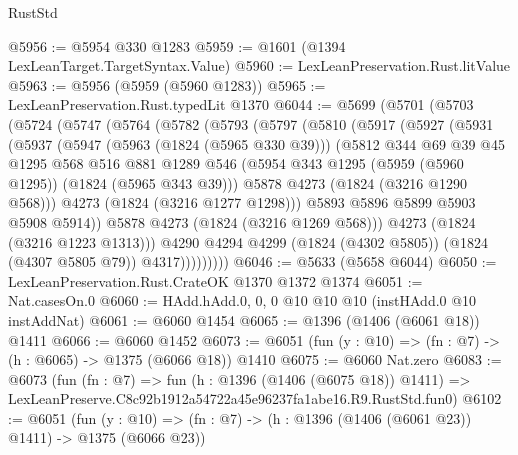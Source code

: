 \begin{lexlean}{RustStd}
\begin{coremodule}
@5956 := @5954 @330 @1283
@5959 := @1601 (@1394 LexLeanTarget.TargetSyntax.Value)
@5960 := LexLeanPreservation.Rust.litValue
@5963 := @5956 (@5959 (@5960 @1283))
@5965 := LexLeanPreservation.Rust.typedLit @1370
@6044 := @5699
    (@5701
      (@5703
        (@5724
          (@5747
            (@5764
              (@5782
                (@5793
                  (@5797
                    (@5810
                      (@5917
                        (@5927
                          (@5931
                            (@5937
                              (@5947
                                (@5963 (@1824 (@5965 @330 @39)))
                                (@5812
                                  @344
                                  @69
                                  @39
                                  @45
                                  @1295
                                  @568
                                  @516
                                  @881
                                  @1289
                                  @546
                                  (@5954 @343 @1295 (@5959 (@5960 @1295)) (@1824 (@5965 @343 @39)))
                                  @5878
                                  @4273
                                  (@1824 (@3216 @1290 @568)))
                                @4273
                                (@1824 (@3216 @1277 @1298)))
                              @5893
                              @5896
                              @5899
                              @5903
                              @5908
                              @5914))
                          @5878
                          @4273
                          (@1824 (@3216 @1269 @568)))
                        @4273
                        (@1824 (@3216 @1223 @1313)))
                      @4290
                      @4294
                      @4299
                      (@1824 (@4302 @5805))
                      (@1824 (@4307 @5805 @79))
                      @4317)))))))))
@6046 := @5633 (@5658 @6044)
@6050 := LexLeanPreservation.Rust.CrateOK @1370 @1372 @1374
@6051 := Nat.casesOn.{0}
@6060 := HAdd.hAdd.{0, 0, 0} @10 @10 @10 (instHAdd.{0} @10 instAddNat)
@6061 := @6060 @1454
@6065 := @1396 (@1406 (@6061 @18)) @1411
@6066 := @6060 @1452
@6073 := @6051 (fun (y : @10) => (fn : @7) -> (h : @6065) -> @1375 (@6066 @18)) @1410
@6075 := @6060 Nat.zero
@6083 := @6073
    (fun (fn : @7) =>
    fun (h : @1396 (@1406 (@6075 @18)) @1411) =>
    LexLeanPreserve.C8c92b1912a54722a45e96237fa1abe16.R9.RustStd.fun0)
@6102 := @6051
    (fun (y : @10) => (fn : @7) -> (h : @1396 (@1406 (@6061 @23)) @1411) -> @1375 (@6066 @23))

\end{coremodule}
\end{lexlean}

